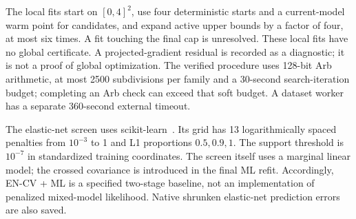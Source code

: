 \documentclass[11pt,a4paper]{article}
\theoremstyle{remark}\newtheorem{remark}[theorem]{Remark}
\begin{document}
The local fits start on $[0,4]^2$, use four deterministic starts and a current-model
warm point for candidates, and expand active upper bounds by a factor of four,
at most six times. A fit touching the final cap is unresolved. These local fits
have no global certificate. A projected-gradient residual is recorded as a
diagnostic; it is not a proof of global optimization. The verified procedure
uses 128-bit Arb arithmetic, at most 2500 subdivisions per family and a
30-second search-iteration budget; completing an Arb check can exceed that
soft budget. A dataset worker has a separate 360-second external timeout.

The elastic-net screen uses scikit-learn~\cite{sklearnenet}. Its grid has 13
logarithmically spaced penalties from $10^{-3}$ to 1 and L1 proportions
$0.5,0.9,1$. The support threshold is $10^{-7}$ in standardized training
coordinates. The screen itself uses a marginal linear model; the crossed
covariance is introduced in the final ML refit. Accordingly, EN-CV + ML is
a specified two-stage baseline, not an implementation of penalized mixed-model
likelihood. Native shrunken elastic-net prediction errors are also saved.
\end{document}
